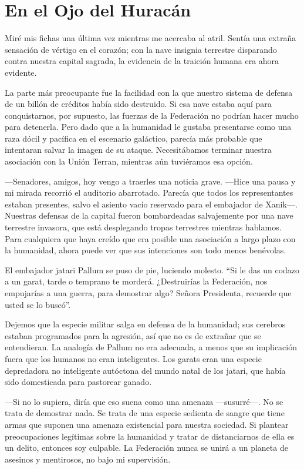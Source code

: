 \chapter{En el Ojo del Huracán}\label{sec:en-el-ojo-del-huracan}

Miré mis fichas una última vez mientras me acercaba al atril. Sentía una extraña sensación de vértigo en el corazón; con la nave insignia terrestre disparando contra nuestra capital sagrada, la evidencia de la traición humana era ahora evidente.

La parte más preocupante fue la facilidad con la que nuestro sistema de defensa de un billón de créditos había sido destruido. Si esa nave estaba aquí para conquistarnos, por supuesto, las fuerzas de la Federación no podrían hacer mucho para detenerla. Pero dado que a la humanidad le gustaba presentarse como una raza dócil y pacífica en el escenario galáctico, parecía más probable que intentaran salvar la imagen de su ataque. Necesitábamos terminar nuestra asociación con la Unión Terran, mientras aún tuviéramos esa opción.

—Senadores, amigos, hoy vengo a traerles una noticia grave. —Hice una pausa y mi mirada recorrió el auditorio abarrotado. Parecía que todos los representantes estaban presentes, salvo el asiento vacío reservado para el embajador de Xanik—. Nuestras defensas de la capital fueron bombardeadas salvajemente por una nave terrestre invasora, que está desplegando tropas terrestres mientras hablamos. Para cualquiera que haya creído que era posible una asociación a largo plazo con la humanidad, ahora puede ver que sus intenciones son todo menos benévolas.

El embajador jatari Pallum se puso de pie, luciendo molesto. ``Si le das un codazo a un garat, tarde o temprano te morderá. ¿Destruirías la Federación, nos empujarías a una guerra, para demostrar algo? Señora Presidenta, recuerde que usted se lo buscó''.

Dejemos que la especie militar salga en defensa de la humanidad; sus cerebros estaban programados para la agresión, así que no es de extrañar que se entendieran. La analogía de Pallum no era adecuada, a menos que su implicación fuera que los humanos no eran inteligentes. Los garats eran una especie depredadora no inteligente autóctona del mundo natal de los jatari, que había sido domesticada para pastorear ganado.

—Si no lo supiera, diría que eso suena como una amenaza —susurré—. No se trata de demostrar nada. Se trata de una especie sedienta de sangre que tiene armas que suponen una amenaza existencial para nuestra sociedad. Si plantear preocupaciones legítimas sobre la humanidad y tratar de distanciarnos de ella es un delito, entonces soy culpable. La Federación nunca se unirá a un planeta de asesinos y mentirosos, no bajo mi supervisión.

